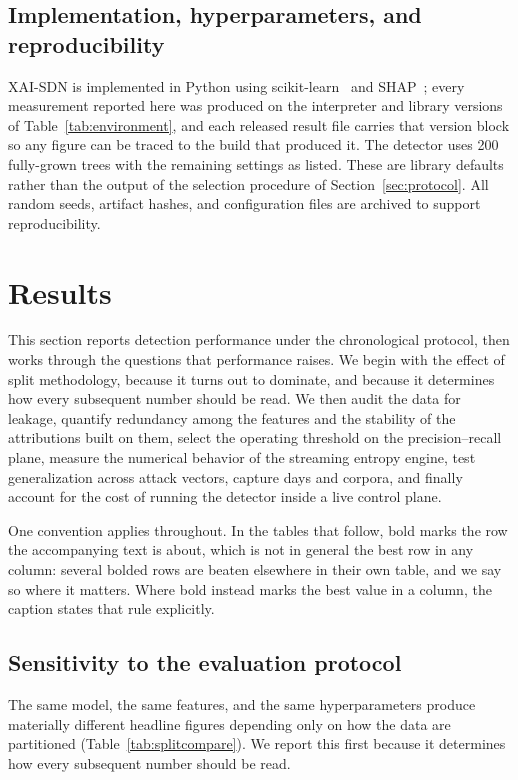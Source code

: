 \documentclass{ieeeaccess}
\begin{document}
\subsection{Implementation, hyperparameters, and reproducibility}
XAI-SDN is implemented in Python using scikit-learn~\cite{pedregosa2011sklearn} and SHAP~\cite{lundberg2017shap}; every measurement reported here was produced on the interpreter and library versions of Table~\ref{tab:environment}, and each released result file carries that version block so any figure can be traced to the build that produced it. The detector uses 200 fully-grown trees with the remaining settings as listed. These are library defaults rather than the output of the selection procedure of Section~\ref{sec:protocol}. All random seeds, artifact hashes, and configuration files are archived to support reproducibility.



\section{Results}
\label{sec:results}

This section reports detection performance under the chronological protocol, then works through the questions that performance raises. We begin with the effect of split methodology, because it turns out to dominate, and because it determines how every subsequent number should be read. We then audit the data for leakage, quantify redundancy among the features and the stability of the attributions built on them, select the operating threshold on the precision--recall plane, measure the numerical behavior of the streaming entropy engine, test generalization across attack vectors, capture days and corpora, and finally account for the cost of running the detector inside a live control plane.

One convention applies throughout. In the tables that follow, bold marks the row the accompanying text is about, which is not in general the best row in any column: several bolded rows are beaten elsewhere in their own table, and we say so where it matters. Where bold instead marks the best value in a column, the caption states that rule explicitly.

\subsection{Sensitivity to the evaluation protocol}
\label{sec:splitresult}
The same model, the same features, and the same hyperparameters produce materially different headline figures depending only on how the data are partitioned (Table~\ref{tab:splitcompare}). We report this first because it determines how every subsequent number should be read.
\end{document}
